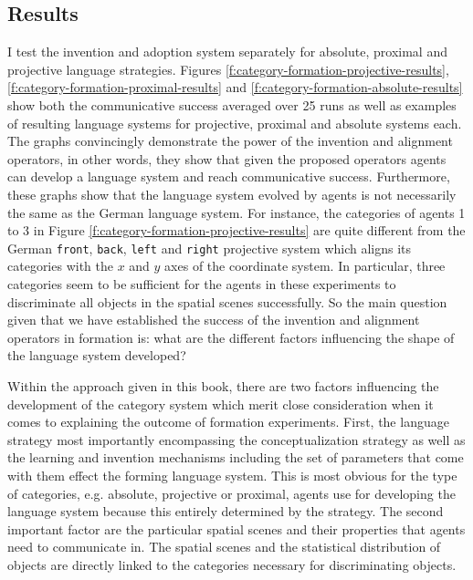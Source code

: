 \subsection{Results}
I test the invention and adoption system separately for absolute, proximal and
projective language strategies. Figures \ref{f:category-formation-projective-results}, 
\ref{f:category-formation-proximal-results} 
and \ref{f:category-formation-absolute-results} show both the communicative success
averaged over 25 runs as well as examples of resulting language systems for
projective, proximal and absolute systems each. The graphs convincingly 
demonstrate the power of the invention and alignment operators, in other words, 
they show that given the proposed operators agents can develop a language
system and reach communicative success. Furthermore, these graphs show
that the language system evolved by agents is not necessarily the same
as the German language system. For instance, the categories of agents 1 to 3
in Figure \ref{f:category-formation-projective-results} are quite different from the 
German {\footnotesize\tt front}, {\footnotesize\tt back}, {\footnotesize\tt left} and {\footnotesize\tt right} projective
system which aligns its categories with the $x$ and $y$ axes of the coordinate system.
In particular, three categories seem to be sufficient for the agents in these experiments 
to discriminate all objects in the spatial scenes successfully. So the main question
given that we have established the success of the invention and alignment operators in formation 
is: what are the different factors influencing the shape of the language system developed?

Within the approach given in this book, there are two factors influencing the 
development of the category system which merit close consideration when 
it comes to explaining the outcome of formation experiments. 
First, the language strategy most importantly encompassing the conceptualization 
strategy as well as the learning and invention mechanisms including the 
set of parameters that come with them effect the forming language system. 
This is most obvious for the type of categories, e.g. absolute, projective or proximal, 
agents use for developing the language system because this entirely determined by
the strategy. The second important factor are the particular spatial scenes and their
properties that agents need to communicate in. The spatial scenes and the statistical 
distribution of objects are directly linked to the categories necessary for
discriminating objects.

